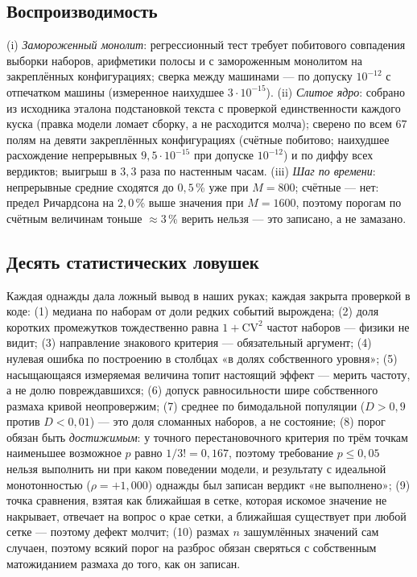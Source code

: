 \documentclass[11pt,a4paper]{article}
\theoremstyle{remark}
\newcommand{\code}[1]{\texttt{\detokenize{#1}}}
\begin{document}
\subsection{Воспроизводимость}\label{sec:repro}
(i) \emph{Замороженный монолит}: регрессионный тест требует побитового
совпадения выборки наборов, арифметики полосы и \code{simulate} с замороженным
монолитом на закреплённых конфигурациях; сверка между машинами --- по допуску $10^{-12}$ с
отпечатком машины (измеренное наихудшее $3\cdot10^{-15}$). (ii) \emph{Слитое ядро}:
собрано из исходника эталона подстановкой текста с проверкой единственности каждого
куска (правка модели ломает сборку, а не расходится молча); сверено по всем 67 полям
на девяти закреплённых конфигурациях (счётные побитово; наихудшее расхождение
непрерывных $9{,}5\cdot10^{-15}$ при допуске $10^{-12}$) и по диффу всех вердиктов;
выигрыш в $3{,}3$ раза по настенным часам. (iii) \emph{Шаг по времени}: непрерывные
средние сходятся до $0{,}5$\,\% уже при $M=800$; счётные --- нет: предел Ричардсона на
$2{,}0$\,\% выше значения при $M=1600$, поэтому порогам по счётным величинам тоньше
$\approx3$\,\% верить нельзя --- это записано, а не замазано.

\subsection{Десять статистических ловушек}\label{sec:traps}
Каждая однажды дала ложный вывод в наших руках; каждая закрыта проверкой в коде:
(1) медиана по наборам от доли редких событий вырождена; (2) доля коротких промежутков
тождественно равна $1+\mathrm{CV}^2$ частот наборов --- физики не видит; (3) направление
знакового критерия --- обязательный аргумент; (4) нулевая ошибка по построению в
столбцах «в долях собственного уровня»; (5) насыщающаяся измеряемая величина топит
настоящий эффект --- мерить частоту, а не долю повреждавшихся; (6) допуск
равносильности шире собственного размаха кривой неопровержим; (7) среднее по
бимодальной популяции ($D>0{,}9$ против $D<0{,}01$) --- это доля сломанных наборов, а
не состояние; (8) порог обязан быть \emph{достижимым}: у точного перестановочного критерия
по трём точкам наименьшее возможное $p$ равно $1/3!=0{,}167$, поэтому требование $p\le0{,}05$
нельзя выполнить ни при каком поведении модели, и результату с идеальной монотонностью
($\rho=+1{,}000$) однажды был записан вердикт «не выполнено»; (9) точка сравнения, взятая как
ближайшая в сетке, которая искомое значение не накрывает, отвечает на вопрос о крае сетки,
а ближайшая существует при любой сетке --- поэтому дефект молчит; (10) размах $n$ зашумлённых
значений сам случаен, поэтому всякий порог на разброс обязан сверяться с собственным
матожиданием размаха до того, как он записан.
\end{document}
